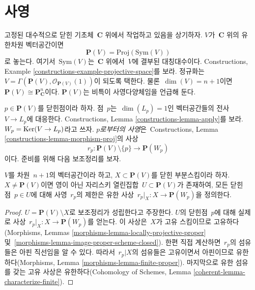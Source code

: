 \section{사영}
\label{section-projection}

\noindent
고정된 대수적으로 닫힌 기초체\  $\mathbf{C}$ 위에서 작업하고 있음을 상기하자.
$V$가\  $\mathbf{C}$ 위의 유한차원 벡터공간이면
$$
\mathbf{P}(V) = \text{Proj}(\text{Sym}(V))
$$
로 놓는다. 여기서\  $\text{Sym}(V)$는\  $\mathbf{C}$ 위에서\  $V$에 결부된
대칭대수이다. Constructions, Example
\ref{constructions-example-projective-space}를 보라.
정규화는\  $V = \Gamma(\mathbf{P}(V), \mathcal{O}_{\mathbf{P}(V)}(1))$이
되도록 택한다. 물론\  $\dim(V) = n + 1$이면\ 
$\mathbf{P}(V) \cong \mathbf{P}^n_{\mathbf{C}}$이다.
$\mathbf{P}(V)$는 비특이 사영다양체임을 언급해 둔다.

\medskip\noindent
$p \in \mathbf{P}(V)$를 닫힌점이라 하자. 점\  $p$는\ 
$\dim(L_p) = 1$인 벡터공간들의 전사\  $V \to L_p$에 대응한다.
Constructions, Lemma \ref{constructions-lemma-apply}를 보라.
$W_p = \mathop{\mathrm{Ker}}(V \to L_p)$라고 쓰자. {\it $p$로부터의 사영}은\ 
Constructions, Lemma \ref{constructions-lemma-morphism-proj}의 사상
$$
r_p : \mathbf{P}(V) \setminus \{p\} \longrightarrow \mathbf{P}(W_p)
$$
이다. 준비를 위해 다음 보조정리를 보자.

\begin{lemma}
\label{lemma-projection-generically-finite}
$V$를 차원\  $n + 1$의 벡터공간이라 하고,
$X \subset \mathbf{P}(V)$를 닫힌 부분스킴이라 하자.
$X \not = \mathbf{P}(V)$이면 영이 아닌 자리스키 열린집합\ 
$U \subset \mathbf{P}(V)$가 존재하여, 모든 닫힌점\  $p \in U$에 대해
사영\  $r_p$의 제한은 유한 사상\ 
$r_p|_X : X \to \mathbf{P}(W_p)$을 정의한다.
\end{lemma}

\begin{proof}
$U = \mathbf{P}(V) \setminus X$로 보조정리가 성립한다고 주장한다.
$U$의 닫힌점\  $p$에 대해 실제로 사상\ 
$r_p|_X : X \to \mathbf{P}(W_p)$를 얻는다. 이 사상은\  $X$가 고유 스킴이므로
고유하다(Morphisms, Lemmas \ref{morphisms-lemma-locally-projective-proper} 및\ 
\ref{morphisms-lemma-image-proper-scheme-closed}). 한편 직접 계산하면\ 
$r_p$의 섬유들은 아핀 직선임을 알 수 있다. 따라서\  $r_p|X$의 섬유들은
고유이면서 아핀이므로 유한하다(Morphisms, Lemma
\ref{morphisms-lemma-finite-proper}). 마지막으로 유한 섬유를 갖는 고유 사상은
유한하다(Cohomology of Schemes, Lemma
\ref{coherent-lemma-characterize-finite}).
\end{proof}

